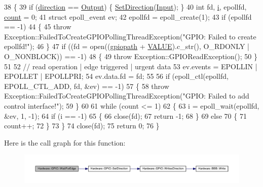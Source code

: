 \begin{DoxyCode}
38     \{
39         \textcolor{keywordflow}{if} (\hyperlink{class_hardware_1_1_g_p_i_o_a77e93e4f6650507fdc4898d272d540e7}{direction} == \hyperlink{class_hardware_1_1_g_p_i_o_a7507431d6341c146f22dcdb21b78ffd4a72432a9b39a6e45297b1158da8bb60eb}{Output}) \{ \hyperlink{class_hardware_1_1_g_p_i_o_a4a9fc2f7be304a6b23c2a2876b4c6bf9}{SetDirection}(\hyperlink{class_hardware_1_1_g_p_i_o_a7507431d6341c146f22dcdb21b78ffd4a5614339496b61db558bd9a26a327088e}{Input}); \}
40         \textcolor{keywordtype}{int} fd, \hyperlink{_comparision_pictures_2_createtest_image_8m_a6f6ccfcf58b31cb6412107d9d5281426}{i}, epollfd, \hyperlink{_comparision_pictures_2_createtest_image_8m_ae11b3deb3de3df7dc48e439074023e35}{count} = 0;
41         \textcolor{keyword}{struct }epoll\_event ev;
42         epollfd = epoll\_create(1);
43         \textcolor{keywordflow}{if} (epollfd == -1)
44         \{
45             \textcolor{keywordflow}{throw} Exception::FailedToCreateGPIOPollingThreadException(\textcolor{stringliteral}{"GPIO: Failed to create epollfd!"});
46         \}
47         \textcolor{keywordflow}{if} ((fd = open((\hyperlink{class_hardware_1_1_g_p_i_o_ac47062ed6aba52b9e8506e1575bf5061}{gpiopath} + \hyperlink{_g_p_i_o_8h_aa0b03826c8f7cc324ac2db0ada2dce0a}{VALUE}).c\_str(), O\_RDONLY | O\_NONBLOCK)) == -1)
48         \{
49             \textcolor{keywordflow}{throw} Exception::GPIOReadException();
50         \}
51 
52         \textcolor{comment}{// read operation | edge triggered | urgent data}
53         ev.events = EPOLLIN | EPOLLET | EPOLLPRI;
54         ev.data.fd = fd;
55 
56         \textcolor{keywordflow}{if} (epoll\_ctl(epollfd, EPOLL\_CTL\_ADD, fd, &ev) == -1)
57         \{
58             \textcolor{keywordflow}{throw} Exception::FailedToCreateGPIOPollingThreadException(\textcolor{stringliteral}{"GPIO: Failed to add control
       interface!"});
59         \}
60 
61         \textcolor{keywordflow}{while} (count <= 1)
62         \{
63             i = epoll\_wait(epollfd, &ev, 1, -1);
64             \textcolor{keywordflow}{if} (i == -1)
65             \{
66                 close(fd);
67                 \textcolor{keywordflow}{return} -1;
68             \}
69             \textcolor{keywordflow}{else}
70             \{
71                 count++;
72             \}
73         \}
74         close(fd);
75         \textcolor{keywordflow}{return} 0;
76     \}
\end{DoxyCode}


Here is the call graph for this function\+:\nopagebreak
\begin{figure}[H]
\begin{center}
\leavevmode
\includegraphics[width=350pt]{class_hardware_1_1_g_p_i_o_afd1340f1a1907168e7dc4ad24027b96a_cgraph}
\end{center}
\end{figure}




